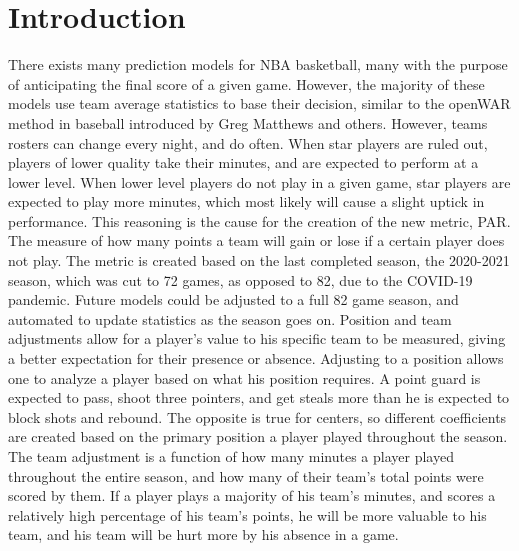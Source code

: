 \documentclass[12pt, titlepage]{article}
\begin{document}
\section{Introduction}
There exists many prediction models for NBA basketball, many with the purpose of anticipating the final 
score of a given game. However, the majority of these models use team average statistics to base their 
decision, similar to the openWAR method in baseball introduced by Greg Matthews and others. However, 
teams rosters can change every night, and do often. When star players are ruled out, players of lower 
quality take their minutes, and are expected to perform at a lower level. When lower level players do not 
play in a given game, star players are expected to play more minutes, which most likely will cause a slight 
uptick in performance. This reasoning is the cause for the creation of the new metric, PAR. The measure of 
how many points a team will gain or lose if a certain player does not play. The metric is created based on 
the last completed season, the 2020-2021 season, which was cut to 72 games, as opposed to 82, due to 
the COVID-19 pandemic. Future models could be adjusted to a full 82 game season, and automated to 
update statistics as the season goes on. Position and team adjustments allow for a player's value to his 
specific team to be measured, giving a better expectation for their presence or absence. Adjusting to a 
position allows one to analyze a player based on what his position requires. A point guard is expected to 
pass, shoot three pointers, and get steals more than he is expected to block shots and rebound. The 
opposite is true for centers, so different coefficients are created based on the primary position a player 
played throughout the season. The team adjustment is a function of how many minutes a player played 
throughout the entire season, and how many of their team's total points were scored by them. If a player 
plays a majority of his team's minutes, and scores a relatively high percentage of his team's points, he will 
be more valuable to his team, and his team will be hurt more by his absence in a game.
\end{document}
